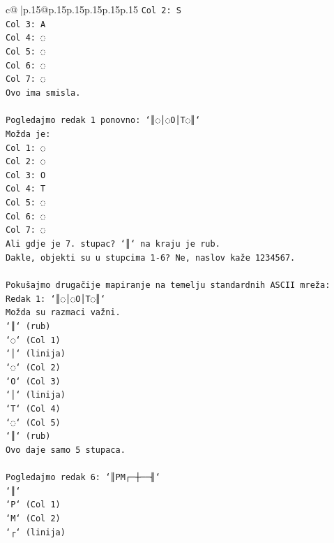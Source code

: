 \documentclass{article}
\begin{document}
{\begin{supertabular}{c@{$\;$}|p{.15\linewidth}@{}p{.15\linewidth}p{.15\linewidth}p{.15\linewidth}p{.15\linewidth}p{.15\linewidth}}
{{{\texttt{Col 2: S} \\
\texttt{Col 3: A} \\
\texttt{Col 4: ◌} \\
\texttt{Col 5: ◌} \\
\texttt{Col 6: ◌} \\
\texttt{Col 7: ◌} \\
\texttt{Ovo ima smisla.} \\
\\ 
\texttt{Pogledajmo redak 1 ponovno: `║◌│◌O│T◌║`} \\
\texttt{Možda je:} \\
\texttt{Col 1: ◌} \\
\texttt{Col 2: ◌} \\
\texttt{Col 3: O} \\
\texttt{Col 4: T} \\
\texttt{Col 5: ◌} \\
\texttt{Col 6: ◌} \\
\texttt{Col 7: ◌} \\
\texttt{Ali gdje je 7. stupac? `║` na kraju je rub.} \\
\texttt{Dakle, objekti su u stupcima 1{-}6? Ne, naslov kaže 1234567.} \\
\\ 
\texttt{Pokušajmo drugačije mapiranje na temelju standardnih ASCII mreža:} \\
\texttt{Redak 1: `║◌│◌O│T◌║`} \\
\texttt{Možda su razmaci važni.} \\
\texttt{`║` (rub)} \\
\texttt{`◌` (Col 1)} \\
\texttt{`│` (linija)} \\
\texttt{`◌` (Col 2)} \\
\texttt{`O` (Col 3)} \\
\texttt{`│` (linija)} \\
\texttt{`T` (Col 4)} \\
\texttt{`◌` (Col 5)} \\
\texttt{`║` (rub)} \\
\texttt{Ovo daje samo 5 stupaca.} \\
\\ 
\texttt{Pogledajmo redak 6: `║PM┌─┼──╢`} \\
\texttt{`║`} \\
\texttt{`P` (Col 1)} \\
\texttt{`M` (Col 2)} \\
\texttt{`┌` (linija)} \\
}}}
\end{supertabular}}
\end{document}
